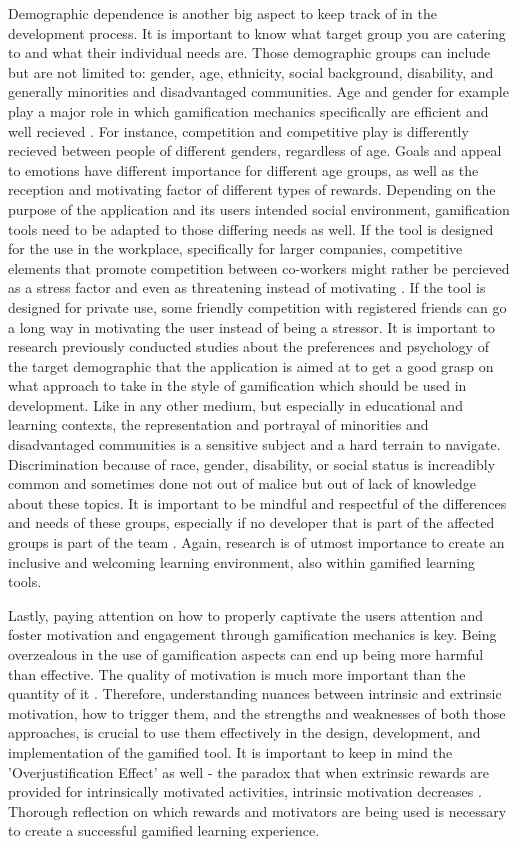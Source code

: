 Demographic dependence is another big aspect to keep track of in the development process. It is important to know what target group you are catering to and what their individual needs are. Those demographic groups can include but are not limited to: gender, age, ethnicity, social background, disability, and generally minorities and disadvantaged communities.
Age and gender for example play a major role in which gamification mechanics specifically are efficient and well recieved \cite{fail}. For instance, competition and competitive play is differently recieved between people of different genders, regardless of age. Goals and appeal to emotions have different importance for different age groups, as well as the reception and motivating factor of different types of rewards.
Depending on the purpose of the application and its users intended social environment, gamification tools need to be adapted to those differing needs as well. If the tool is designed for the use in the workplace, specifically for larger companies, competitive elements that promote competition between co-workers might rather be percieved as a stress factor and even as threatening instead of motivating \cite{lifelong}. If the tool is designed for private use, some friendly competition with registered friends can go a long way in motivating the user instead of being a stressor.
It is important to research previously conducted studies about the preferences and psychology of the target demographic that the application is aimed at to get a good grasp on what approach to take in the style of gamification which should be used in development.
Like in any other medium, but especially in educational and learning contexts, the representation and portrayal of minorities and disadvantaged communities is a sensitive subject and a hard terrain to navigate. Discrimination because of race, gender, disability, or social status is increadibly common and sometimes done not out of malice but out of lack of knowledge about these topics. It is important to be mindful and respectful of the differences and needs of these groups, especially if no developer that is part of the affected groups is part of the team \cite{engage}. Again, research is of utmost importance to create an inclusive and welcoming learning environment, also within gamified learning tools.

Lastly, paying attention on how to properly captivate the users attention and foster motivation and engagement through gamification mechanics is key. Being overzealous in the use of gamification aspects can end up being more harmful than effective. The quality of motivation is much more important than the quantity of it \cite{equilibrium}. Therefore, understanding nuances between intrinsic and extrinsic motivation, how to trigger them, and the strengths and weaknesses of both those approaches, is crucial to use them effectively in the design, development, and implementation of the gamified tool. It is important to keep in mind the 'Overjustification Effect' as well - the paradox that when extrinsic rewards are provided for intrinsically motivated activities, intrinsic motivation decreases \cite{equilibrium}. Thorough reflection on which rewards and motivators are being used is necessary to create a successful gamified learning experience.

